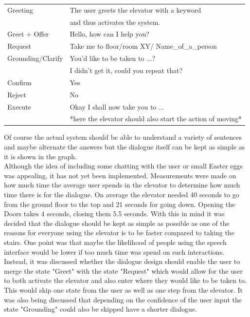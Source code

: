 \documentclass[a4paper, 12pt]{article}
\begin{document}
\begin{tabular}{|ll|}
  \hline
  Greeting & The user greets the elevator with a keyword \\
    & and thus activates the system.  \\
  Greet + Offer & Hello, how can I help you? \\
  Request & Take me to floor/room XY/ Name\_of\_a\_person \\
  Grounding/Clarify & You'd like to be taken to ...?\\
   & I didn't get it, could you repeat that? \\
  Confirm & Yes \\
  Reject & No \\
  Execute & Okay I shall now take you to ... \\
   & *here the elevator should also start the action of moving* \\
  \hline
\end{tabular}
\newline
Of course the actual system should be able to understand a variety of sentences and maybe alternate the answers but the dialogue itself can be kept as simple as it is shown in the graph.  \\

Although the idea of including some chatting with the user or small Easter eggs was appealing, it has not yet been implemented.
Measurements were made on how much time the average user spends in the elevator to determine how much time there is for the dialogue.
On average the elevator needed 40 seconds to go from the ground floor to the top and 21 seconds for going down. Opening the Doors takes 4 seconds, closing them 5.5 seconds.
With this in mind it was decided that the dialogue should be kept as simple as possible as one of the reasons for everyone using the elevator is to be faster compared to taking the stairs.
One point was that maybe the likelihood of people using the speech interface would be lower if too much time was spend on such interactions.\\

Instead, it was discussed whether the dialogue design should enable the user to merge the state "Greet" with the state "Request" which would allow for the user to both activate the elevator and also enter where they would like to be taken to.
This would skip one state from the user as well as one step from the elevator.
It was also being discussed that depending on the confidence of the user input the state "Grounding" could also be skipped have a shorter dialogue.\\
\end{document}
